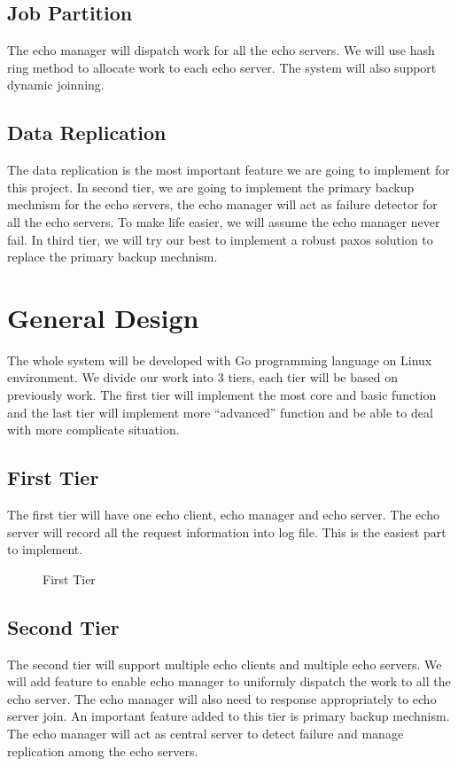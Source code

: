 \documentclass[12pt]{article}
\begin{document}
\subsection{Job Partition}
The echo manager will dispatch work for all the echo servers. We will use hash ring
method to allocate work to each echo server. The system will also support dynamic
joinning.

\subsection{Data Replication}
The data replication is the most important feature we are going to implement for this 
project. In second tier, we are going to implement the primary backup mechnism for the
echo servers, the echo manager will act as failure detector for all the echo servers. 
To make life easier, we will assume the echo manager never fail. In third tier, we will
try our best to implement a robust paxos solution to replace the primary backup mechnism. 

\section{General Design}
The whole system will be developed with Go programming language on Linux 
environment. We divide our work into 3 tiers, each tier will be based on 
previously work. The first tier will implement the most core and basic function 
and the last tier will implement more ``advanced'' function and be able to 
deal with more complicate situation.

\subsection{First Tier}
The first tier will have one echo client, echo manager and echo server. The
echo server will record all the request information into log file. This is the
easiest part to implement.

\begin{figure}[H]
\caption{First Tier}
\label{fig:speciation}
\end{figure}

\subsection{Second Tier}
The second tier will support multiple echo clients and multiple echo servers. 
We will add feature to enable echo manager to uniformly dispatch the work 
to all the echo server. The echo manager will also need to response appropriately 
to echo server join. An important feature added to this tier is primary backup mechnism.
The echo manager will act as central server to detect failure and manage replication
among the echo servers.
\end{document}
